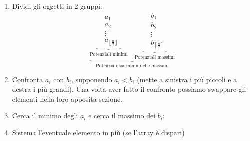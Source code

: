 \documentclass[a4paper]{article}
\begin{document}
\begin{enumerate}
  \item Dividi gli oggetti in 2 gruppi:
    \[
      \underbrace{
        \underbrace{
          \begin{aligned}
          &a_1\\
          &a_2\\
          &\vdots\\
          &a_{\left\lfloor \frac{n}{2} \right\rfloor}
          \end{aligned}
        }_{\text{Potenziali minimi}}
        \quad
        \underbrace{
          \begin{aligned}
        &b_1\\
        &b_2\\
        &\vdots\\
        &b_{\left\lceil \frac{n}{2} \right\rceil}
          \end{aligned}
        }_{\text{Potenziali massimi}}
      }_{\text{Potenziali sia minimi che massimi}}
    \]

  \item Confronta \( a_i \) con \( b_i \), supponendo \( a_i < b_i \) (mette a sinistra
    i più piccoli e a destra i più grandi). Una volta aver fatto il confronto possiamo swappare
     gli elementi nella loro apposita sezione.

  \item Cerca il minimo degli \( a_i \) e cerca il massimo dei \( b_i \):

  \item Sistema l'eventuale elemento in più (se l'array è dispari)
\end{enumerate}
\end{document}
